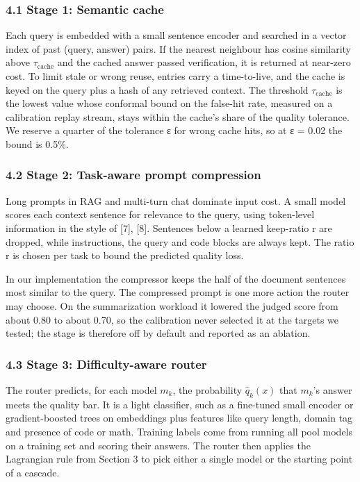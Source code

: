 \documentclass[
  10pt,
]{article}
\begin{document}
\subsubsection{4.1 Stage 1: Semantic
cache}\label{stage-1-semantic-cache}

Each query is embedded with a small sentence encoder and searched in a
vector index of past (query, answer) pairs. If the nearest neighbour has
cosine similarity above \(\tau_{\mathrm{cache}}\) and the cached answer
passed verification, it is returned at near-zero cost. To limit stale or
wrong reuse, entries carry a time-to-live, and the cache is keyed on the
query plus a hash of any retrieved context. The threshold
\(\tau_{\mathrm{cache}}\) is the lowest value whose conformal bound on
the false-hit rate, measured on a calibration replay stream, stays
within the cache's share of the quality tolerance. We reserve a quarter
of the tolerance ε for wrong cache hits, so at ε = 0.02 the bound is
0.5\%.

\subsubsection{4.2 Stage 2: Task-aware prompt
compression}\label{stage-2-task-aware-prompt-compression}

Long prompts in RAG and multi-turn chat dominate input cost. A small
model scores each context sentence for relevance to the query, using
token-level information in the style of {[}7{]}, {[}8{]}. Sentences
below a learned keep-ratio r are dropped, while instructions, the query
and code blocks are always kept. The ratio r is chosen per task to bound
the predicted quality loss.

In our implementation the compressor keeps the half of the document
sentences most similar to the query. The compressed prompt is one more
action the router may choose. On the summarization workload it lowered
the judged score from about 0.80 to about 0.70, so the calibration never
selected it at the targets we tested; the stage is therefore off by
default and reported as an ablation.

\subsubsection{4.3 Stage 3: Difficulty-aware
router}\label{stage-3-difficulty-aware-router}

The router predicts, for each model \(m_k\), the probability
\(\hat{q}_k(x)\) that \(m_k\)'s answer meets the quality bar. It is a
light classifier, such as a fine-tuned small encoder or gradient-boosted
trees on embeddings plus features like query length, domain tag and
presence of code or math. Training labels come from running all pool
models on a training set and scoring their answers. The router then
applies the Lagrangian rule from Section 3 to pick either a single model
or the starting point of a cascade.
\end{document}
